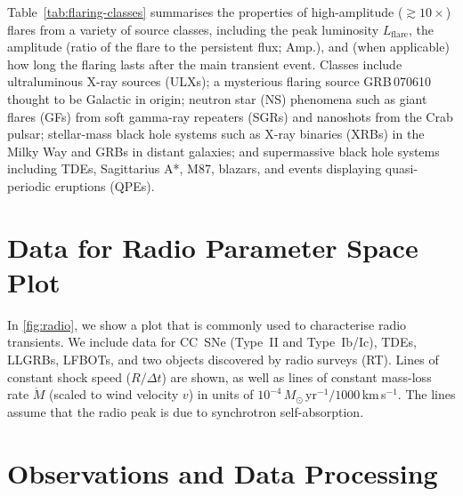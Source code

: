 \documentclass{nature_plusfigure}
\begin{document}
\begin{methods}
Table~\ref{tab:flaring-classes} summarises the properties of high-amplitude ($\gtrsim 10\times$) flares from a variety of source classes,
including the peak luminosity $L_\mathrm{flare}$, the amplitude (ratio of the flare to the persistent flux; Amp.), and (when applicable) how long the flaring lasts after the main transient event.
Classes include ultraluminous X-ray sources (ULXs\cite{Mucciarelli2007}); a mysterious flaring source GRB\,070610 thought to be Galactic in origin\cite{Kasliwal2008,Stefanescu2008,CastroTirado2008};
neutron star (NS) phenomena such as giant flares (GFs) from soft gamma-ray repeaters (SGRs\cite{Svinkin2021,Frederiks2007}) and nanoshots from the Crab pulsar\cite{Hankins2003}; stellar-mass black hole systems such as X-ray binaries (XRBs\cite{Fender1997}) in the Milky Way and GRBs\cite{Racusin2008} in distant galaxies; and supermassive black hole systems including TDEs\cite{vanVelzen2021,Payne2022}, Sagittarius A*\cite{Marrone2008}, M87\cite{Abramowski2012}, blazars\cite{Nesci2021}, and events displaying quasi-periodic eruptions (QPEs\cite{Miniutti2023}).

\section{Data for Radio Parameter Space Plot}
\label{sec:data-radio-parameter-space}

In \ref{fig:radio}, we show a plot that is commonly used to characterise radio transients\cite{Chevalier1998}.
We include data for CC~SNe (Type~II\cite{VanDyk1993,Weiler1986} and Type~Ib/Ic\cite{Soderberg2005,Soderberg2006,Soderberg2010,Salas2013,Corsi2014}), TDEs\cite{Alexander2016}, LLGRBs\cite{Kulkarni1998,Soderberg2006,Margutti2013,Laskar2017}, LFBOTs\cite{Margutti2019,Ho2019,Coppejans2020,Ho2020_Koala,Yao2022,Ho2022_AT2020xnd}, and two objects discovered by radio surveys (RT\cite{Dong2021,Mooley2022}). Lines of constant shock speed ($R/\Delta t$) are shown, as well as lines of constant mass-loss rate $\dot{M}$ (scaled to wind velocity $v$) in units of $10^{-4}\,M_\odot$\,yr$^{-1}/1000\,$km\,s$^{-1}$. The lines assume that the radio peak is due to synchrotron self-absorption\cite{Chevalier1998}. %

\section{Observations and Data Processing}


\end{methods}
\end{document}
